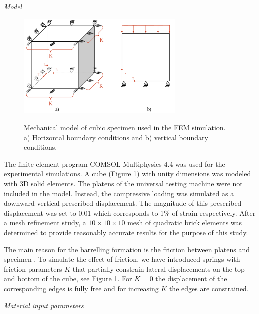 \documentclass[review]{elsarticle}
\begin{document}
\begin{description}
\item{\textit{Model}}
\end{description}

\begin{figure}[h]
\centering
\includegraphics[width=8cm]{BarellingPaper.pdf}
\label{fig:Barrelling}
\caption{\label{fig:Barrelling} Mechanical model of cubic
specimen used in the FEM simulation. ​
a) Horizontal boundary conditions and b) vertical boundary conditions.}
\end{figure}



The finite element program COMSOL Multiphysics 4.4 \cite{Comsol} was used for
the experimental simulations.
A cube (Figure \ref{fig:Barrelling})  with unity dimensions was modeled with
3D solid elements.
The platens of the universal testing machine were not included in the model.
Instead, the compressive loading was simulated as a downward vertical prescribed
displacement. The magnitude of this prescribed displacement was set to 0.01
which corresponds to  1\%  of  strain respectively.
After a mesh refinement study, a $10\times10\times10$ mesh of quadratic brick
elements was determined to provide reasonably accurate results for the purpose of this study.

The main reason for the barrelling formation is the friction between platens
and specimen \cite{Narayanasamy198821, kulkarni1969}. To simulate the effect of friction, 
we have introduced springs with friction parameters $K$ that partially constrain
lateral displacements on the top and bottom of the cube, see Figure \ref{fig:Barrelling}.
For $K=0$ the displacement of the corresponding edges is fully free
and for increasing $K$ the edges are constrained.

\begin{description}
\item{\textit{Material input parameters}}
\end{description}
\end{document}
